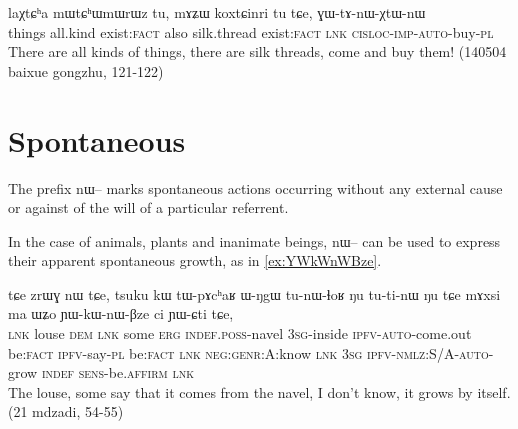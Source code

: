 \documentclass[oldfontcommands,oneside,a4paper,11pt]{article}
\newcommand{\ipa}[1]{{\phon \mbox{#1}}} %
\begin{document}
\begin{exe}
\ex \label{ex:GWtAnWXtWnW}
\gll
\ipa{laχtɕʰa} 	\ipa{mɯtɕʰɯmɯrɯz} 	\ipa{tu,} 	\ipa{mɤʑɯ} 	\ipa{koxtɕinri} 	\ipa{tu} 	\ipa{tɕe,} 	\ipa{ɣɯ-tɤ-nɯ-χtɯ-nɯ} \\ 
things all.kind exist:\textsc{fact} also silk.thread exist:\textsc{fact} \textsc{lnk} \textsc{cisloc-imp-auto}-buy-\textsc{pl} \\
\glt There are all kinds of things, there are silk threads, come and buy them! (140504 baixue gongzhu, 121-122)
\end{exe}


 
\section{Spontaneous}
The prefix \ipa{nɯ--} marks spontaneous actions  occurring without any external cause or against of the will of a particular referrent.

In the case of animals, plants and inanimate beings, \ipa{nɯ--} can be used to express  their apparent spontaneous growth, as in \ref{ex:YWkWnWBze}.
\begin{exe}
\ex \label{ex:YWkWnWBze}
\gll 
\ipa{tɕe} 	\ipa{zrɯɣ} 	\ipa{nɯ} 	\ipa{tɕe,} 	\ipa{tsuku} 	\ipa{kɯ} 	\ipa{tɯ-pɤcʰaʁ} 	\ipa{ɯ-ŋgɯ} 	\ipa{tu-nɯ-ɬoʁ} 	\ipa{ŋu} 	\ipa{tu-ti-nɯ} 	\ipa{ŋu} 	\ipa{tɕe} 	\ipa{mɤxsi} 	\ipa{ma} 	\ipa{ɯʑo} 	\ipa{ɲɯ-kɯ-nɯ-βze} 	\ipa{ci} 	\ipa{ɲɯ-ɕti} 	\ipa{tɕe,} 	\\
\textsc{lnk} louse \textsc{dem} \textsc{lnk} some \textsc{erg} \textsc{indef.poss}-navel \textsc{3sg}-inside \textsc{ipfv-auto}-come.out be:\textsc{fact} \textsc{ipfv}-say-\textsc{pl}  be:\textsc{fact} \textsc{lnk} \textsc{neg:genr:}A:know \textsc{lnk} \textsc{3sg} \textsc{ipfv-nmlz:S/A-auto}-grow \textsc{indef} \textsc{sens}-be.\textsc{affirm} \textsc{lnk} \\
\glt The louse, some say that it comes from the navel, I don't know, it grows by itself. (21 mdzadi, 54-55)
\end{exe}
\end{document}
